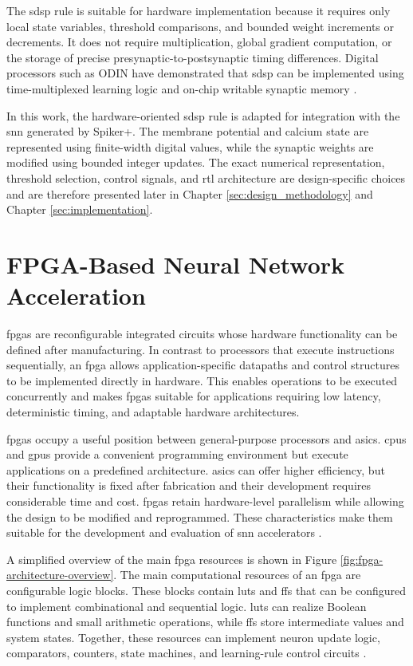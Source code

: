 The \gls{sdsp} rule is suitable for hardware implementation because it requires only local state variables, threshold comparisons, and bounded weight increments or decrements. It does not require multiplication, global gradient computation, or the storage of precise presynaptic-to-postsynaptic timing differences. Digital processors such as ODIN have demonstrated that \gls{sdsp} can be implemented using time-multiplexed learning logic and on-chip writable synaptic memory \cite{Frenkel2019ODIN}.

In this work, the hardware-oriented \gls{sdsp} rule is adapted for integration with the \gls{snn} generated by Spiker+. The membrane potential and calcium state are represented using finite-width digital values, while the synaptic weights are modified using bounded integer updates. The exact numerical representation, threshold selection, control signals, and \gls{rtl} architecture are design-specific choices and are therefore presented later in Chapter \ref{sec:design_methodology} and Chapter \ref{sec:implementation}.

\section{FPGA-Based Neural Network Acceleration}
\label{subsec: fpga-based neural network acceleration}

\gls{fpga}s are reconfigurable integrated circuits whose hardware functionality can be defined after manufacturing. In contrast to processors that execute instructions sequentially, an \gls{fpga} allows application-specific datapaths and control structures to be implemented directly in hardware. This enables operations to be executed concurrently and makes \gls{fpga}s suitable for applications requiring low latency, deterministic timing, and adaptable hardware architectures.

\gls{fpga}s occupy a useful position between general-purpose processors and \gls{asic}s. \gls{cpu}s and \gls{gpu}s provide a convenient programming environment but execute applications on a predefined architecture. \gls{asic}s can offer higher efficiency, but their functionality is fixed after fabrication and their development requires considerable time and cost. \gls{fpga}s retain hardware-level parallelism while allowing the design to be modified and reprogrammed. These characteristics make them suitable for the development and evaluation of \gls{snn} accelerators \cite{Karamimanesh2025}.

A simplified overview of the main \gls{fpga} resources is shown in Figure \ref{fig:fpga-architecture-overview}. The main computational resources of an \gls{fpga} are configurable logic blocks. These blocks contain \gls{lut}s and \gls{ff}s that can be configured to implement combinational and sequential logic. \gls{lut}s can realize Boolean functions and small arithmetic operations, while \gls{ff}s store intermediate values and system states. Together, these resources can implement neuron update logic, comparators, counters, state machines, and learning-rule control circuits \cite{UG474}.

